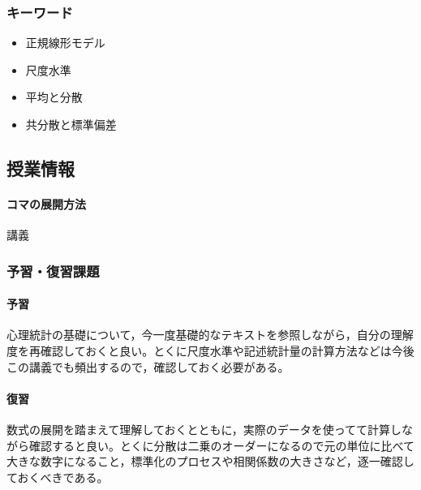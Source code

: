 \subsubsection{キーワード}
\begin{itemize}
	\item 正規線形モデル
	\item 尺度水準
	\item 平均と分散
	\item 共分散と標準偏差
\end{itemize}
\subsection{授業情報}
\paragraph{コマの展開方法}
講義
\subsubsection{予習・復習課題}
\paragraph{予習}
心理統計の基礎について，今一度基礎的なテキストを参照しながら，自分の理解度を再確認しておくと良い。とくに尺度水準や記述統計量の計算方法などは今後この講義でも頻出するので，確認しておく必要がある。
\paragraph{復習}
数式の展開を踏まえて理解しておくとともに，実際のデータを使ってて計算しながら確認すると良い。とくに分散は二乗のオーダーになるので元の単位に比べて大きな数字になること，標準化のプロセスや相関係数の大きさなど，逐一確認しておくべきである。